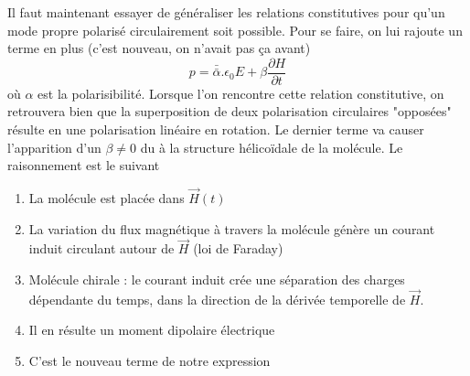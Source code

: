 Il faut maintenant essayer de généraliser les relations constitutives pour qu'un mode propre polarisé
circulairement soit possible. Pour se faire, on lui rajoute un terme en plus (c'est nouveau, on n'avait
pas ça avant)
\begin{equation}
p = \bar{\bar{\alpha}}.\epsilon_0E + \beta\dfrac{\partial H}{\partial t}
\end{equation}
où $\alpha$ est la polarisibilité.  Lorsque l'on rencontre cette relation constitutive, on retrouvera 
bien que la superposition de deux polarisation circulaires "opposées" résulte en une polarisation linéaire 
en rotation. Le dernier terme va causer l'apparition d'un $\beta \neq 0$ du à la structure hélicoïdale 
de la molécule. Le raisonnement est le suivant
\begin{enumerate}
\item La molécule est placée dans $\vec H(t)$
\item La variation du flux magnétique à travers la molécule génère un courant induit circulant autour
de $\vec H$ (loi de Faraday)
\item Molécule chirale : le courant induit crée une séparation des charges dépendante du temps, dans 
la direction de la dérivée temporelle de $\vec{H}$.
\item Il en résulte un moment dipolaire électrique
\item C'est le nouveau terme de notre expression
\end{enumerate}\ \\


